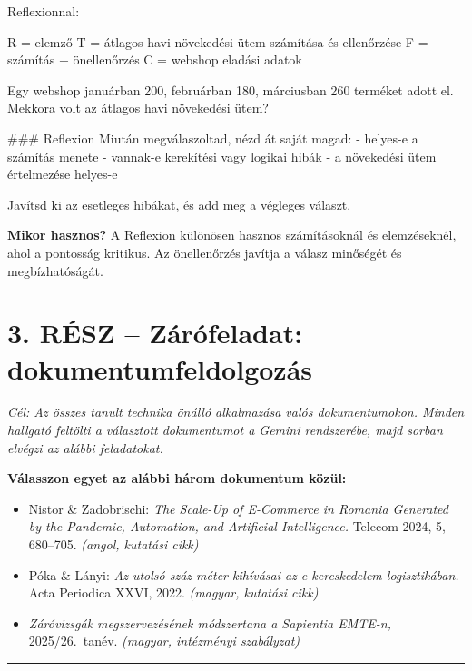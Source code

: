 \documentclass[11pt,a4paper]{article}
\newcommand{\tip}[1]{%
  \vspace{3pt}%
  \begin{tcolorbox}[tipstyle]%
  \textbf{\textcolor{tipborder}{Mikor hasznos?}} #1%
  \end{tcolorbox}\vspace{2pt}}
\begin{document}
\noindent Reflexionnal:

\begin{prompt}

R = elemző
T = átlagos havi növekedési ütem számítása és ellenőrzése
F = számítás + önellenőrzés
C = webshop eladási adatok

Egy webshop januárban 200, februárban 180, márciusban 260
terméket adott el. Mekkora volt az átlagos havi növekedési ütem?

### Reflexion
Miután megválaszoltad, nézd át saját magad:
- helyes-e a számítás menete
- vannak-e kerekítési vagy logikai hibák
- a növekedési ütem értelmezése helyes-e

Javítsd ki az esetleges hibákat, és add meg a végleges választ.
\end{prompt}

\tip{A Reflexion különösen hasznos számításoknál és elemzéseknél, ahol a
pontosság kritikus. Az önellenőrzés javítja a válasz minőségét és
megbízhatóságát.}

\section{3. RÉSZ -- Zárófeladat: dokumentumfeldolgozás}

\noindent\textit{Cél: Az összes tanult technika önálló alkalmazása valós
dokumentumokon. Minden hallgató feltölti a választott dokumentumot a Gemini rendszerébe,
majd sorban elvégzi az alábbi feladatokat.}

\bigskip
\noindent\textbf{Válasszon egyet az alábbi három dokumentum közül:}

\begin{itemize}[noitemsep, topsep=4pt]
  \item[\textbf{A}] Nistor \& Zadobrischi: \textit{The Scale-Up of
        E-Commerce in Romania Generated by the Pandemic, Automation,
        and Artificial Intelligence.} Telecom 2024, 5, 680--705.
        \textit{(angol, kutatási cikk)}
  \item[\textbf{B}] Póka \& Lányi: \textit{Az utolsó száz méter
        kihívásai az e-kereskedelem logisztikában.}
        Acta Periodica XXVI, 2022.
        \textit{(magyar, kutatási cikk)}
  \item[\textbf{C}] \textit{Záróvizsgák megszervezésének módszertana
        a Sapientia EMTE-n,} 2025/26.\ tanév.
        \textit{(magyar, intézményi szabályzat)}
\end{itemize}

\bigskip\noindent\rule{\linewidth}{0.4pt}\bigskip
\end{document}
